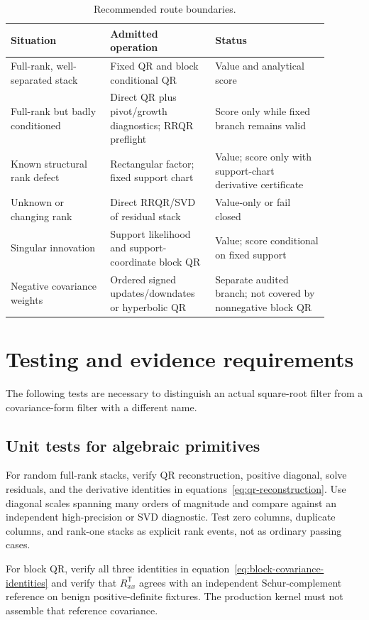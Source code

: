\documentclass[11pt]{article}
\newcommand{\transpose}{^{\mathsf T}}
\begin{document}
\begin{table}[ht]
\centering
\caption{Recommended route boundaries.}
\begin{tabular}{p{0.28\linewidth}p{0.29\linewidth}p{0.32\linewidth}}
\toprule
Situation & Admitted operation & Status \\
\midrule
Full-rank, well-separated stack & Fixed QR and block conditional QR & Value and
  analytical score \\
Full-rank but badly conditioned & Direct QR plus pivot/growth diagnostics; RRQR
  preflight & Score only while fixed branch remains valid \\
Known structural rank defect & Rectangular factor; fixed support chart & Value;
  score only with support-chart derivative certificate \\
Unknown or changing rank & Direct RRQR/SVD of residual stack & Value-only or
  fail closed \\
Singular innovation & Support likelihood and support-coordinate block QR & Value;
  score conditional on fixed support \\
Negative covariance weights & Ordered signed updates/downdates or hyperbolic QR &
  Separate audited branch; not covered by nonnegative block QR \\
\bottomrule
\end{tabular}
\end{table}

\section{Testing and evidence requirements}

The following tests are necessary to distinguish an actual square-root filter
from a covariance-form filter with a different name.

\subsection{Unit tests for algebraic primitives}

For random full-rank stacks, verify QR reconstruction, positive diagonal, solve
residuals, and the derivative identities in equations~\eqref{eq:qr-reconstruction}.
Use diagonal scales spanning many orders of magnitude and compare against an
independent high-precision or SVD diagnostic.  Test zero columns, duplicate
columns, and rank-one stacks as explicit rank events, not as ordinary passing
cases.

For block QR, verify all three identities in equation~\eqref{eq:block-covariance-identities}
and verify that $R_{xx}\transpose$ agrees with an independent Schur-complement
reference on benign positive-definite fixtures.  The production kernel must not
assemble that reference covariance.
\end{document}
